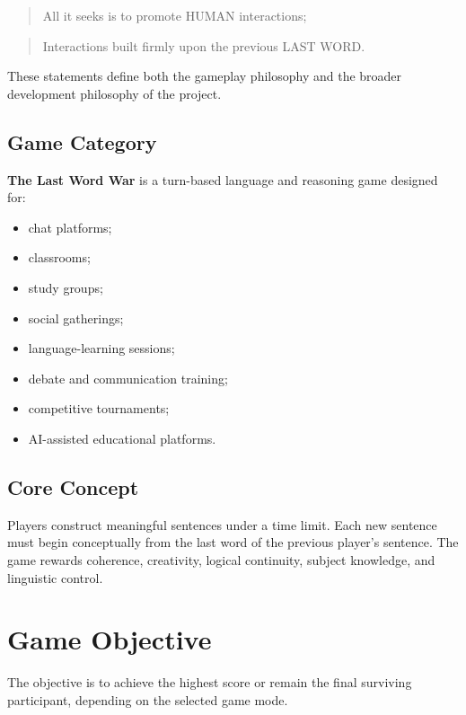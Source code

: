 \documentclass[11pt,a4paper]{article}
\begin{document}
\begin{quote}
All it seeks is to promote HUMAN interactions;
\end{quote}

\begin{quote}
Interactions built firmly upon the previous LAST WORD.
\end{quote}

These statements define both the gameplay philosophy and the broader development philosophy of the project.

\subsection{Game Category}

\textbf{The Last Word War} is a turn-based language and reasoning game designed for:

\begin{itemize}
    \item chat platforms;
    \item classrooms;
    \item study groups;
    \item social gatherings;
    \item language-learning sessions;
    \item debate and communication training;
    \item competitive tournaments;
    \item AI-assisted educational platforms.
\end{itemize}

\subsection{Core Concept}

Players construct meaningful sentences under a time limit. Each new sentence must begin conceptually from the last word of the previous player's sentence. The game rewards coherence, creativity, logical continuity, subject knowledge, and linguistic control.

\section{Game Objective}

The objective is to achieve the highest score or remain the final surviving participant, depending on the selected game mode.
\end{document}
